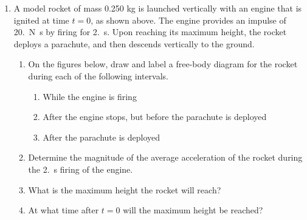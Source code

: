 \documentclass{../../../oss-apphys}
\begin{document}
\begin{enumerate}[leftmargin=15pt]
\item A model rocket of mass 0.250 kg is launched vertically with an engine
  that is ignited at time $t=0$, as shown above. The engine provides an impulse
  of \SI{20.}{\newton\second} by firing for \SI{2.}{\second}. Upon reaching its
  maximum height, the rocket deploys a parachute, and then descends vertically
  to the ground.
  \begin{enumerate}[leftmargin=18pt,topsep=0pt,noitemsep]
  \item On the figures below, draw and label a free-body diagram for the rocket
    during each of the following intervals.
    \begin{multicols}{3}
      \begin{enumerate}
      \item While the engine is firing
      \columnbreak
      \item After the engine stops, but before the parachute is deployed
      \columnbreak
      \item After the parachute is deployed
      \end{enumerate}
    \end{multicols}
  \item Determine the magnitude of the average acceleration of the rocket during
  the \SI{2.}{\second} firing of the engine.
  \item What is the maximum height the rocket will reach?
  \item At what time after $t=0$ will the maximum height be reached?
  \end{enumerate}
  \newpage
  

\end{enumerate}
\end{document}

